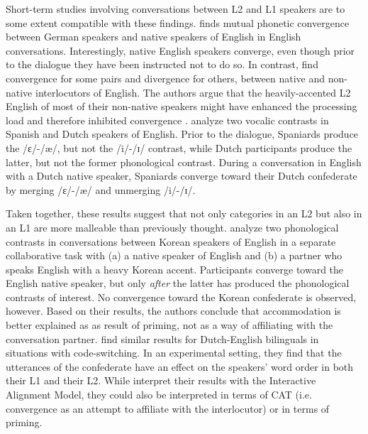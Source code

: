 \documentclass[output=paper]{langscibook}
\begin{document}
Short-term studies involving conversations between L2 and L1 speakers are to some extent compatible with these findings. \textcite{lewandowski_talent_2012} finds mutual phonetic convergence between German speakers and native speakers of English in English conversations. Interestingly, native English speakers converge, even though prior to the dialogue they have been instructed not to do so.
In contrast, \textcite{kim_phonetic_2011} find convergence for some pairs and divergence for others, between native and non-native interlocutors of English. The authors argue that the heavily-accented L2 English of most of their non-native speakers might have enhanced the processing load and therefore inhibited convergence \parencite{kim_phonetic_2011}. \textcite{berry_phonetic_2017} analyze two vocalic contrasts in Spanish and Dutch speakers of English. Prior to the dialogue, Spaniards produce the /ɛ/-/æ/, but not the /i/-/ɪ/ contrast, while Dutch participants produce the latter, but not the former phonological contrast. During a conversation in English with a Dutch native speaker, Spaniards converge toward their Dutch confederate by merging /ɛ/-/æ/ and unmerging /i/-/ɪ/.

Taken together, these results suggest that not only categories in an L2 but also in an L1 are more malleable than previously thought. \textcite{hwang_phonetic_2015} analyze two phonological contrasts in conversations between Korean speakers of English in a separate collaborative task with (a) a native speaker of English and (b) a partner who speaks English with a heavy Korean accent. Participants converge toward the English native speaker, but only \textit{after} the latter has produced the phonological contrasts of interest. No convergence toward the Korean confederate is observed, however. Based on their results, the authors conclude that accommodation is better explained as as result of priming, not as a way of affiliating with the conversation partner. \textcite{kootstra_syntactic_2010} find similar results for Dutch-English bilinguals in situations with code-switching. In an experimental setting, they find that the utterances of the confederate have an effect on the speakers' word order in both their L1 and their L2. While \textcite{kootstra_syntactic_2010} interpret their results with the Interactive Alignment Model, they could also be interpreted in terms of CAT (i.e. convergence as an attempt to affiliate with the interlocutor) or in terms of priming.
\end{document}

